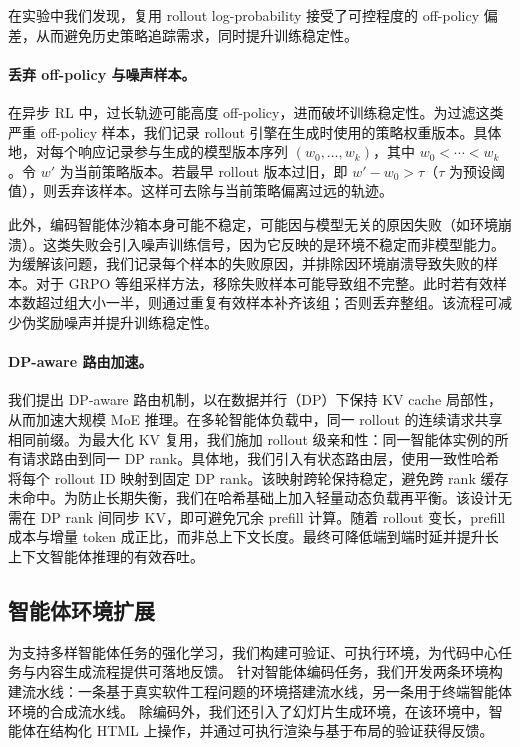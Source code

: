 在实验中我们发现，复用 rollout log-probability 接受了可控程度的 off-policy 偏差，从而避免历史策略追踪需求，同时提升训练稳定性。


\paragraph{丢弃 off-policy 与噪声样本。}
在异步 RL 中，过长轨迹可能高度 off-policy，进而破坏训练稳定性。为过滤这类严重 off-policy 样本，我们记录 rollout 引擎在生成时使用的策略权重版本。具体地，对每个响应记录参与生成的模型版本序列 $(w_0, \ldots, w_k)$，其中 $w_0 < \cdots < w_k$。令 $w'$ 为当前策略版本。若最早 rollout 版本过旧，即 $w' - w_0 > \tau$（$\tau$ 为预设阈值），则丢弃该样本。这样可去除与当前策略偏离过远的轨迹。

此外，编码智能体沙箱本身可能不稳定，可能因与模型无关的原因失败（如环境崩溃）。这类失败会引入噪声训练信号，因为它反映的是环境不稳定而非模型能力。为缓解该问题，我们记录每个样本的失败原因，并排除因环境崩溃导致失败的样本。对于 GRPO 等组采样方法，移除失败样本可能导致组不完整。此时若有效样本数超过组大小一半，则通过重复有效样本补齐该组；否则丢弃整组。该流程可减少伪奖励噪声并提升训练稳定性。


\paragraph{DP-aware 路由加速。}
我们提出 DP-aware 路由机制，以在数据并行（DP）下保持 KV cache 局部性，从而加速大规模 MoE 推理。在多轮智能体负载中，同一 rollout 的连续请求共享相同前缀。为最大化 KV 复用，我们施加 rollout 级亲和性：同一智能体实例的所有请求路由到同一 DP rank。具体地，我们引入有状态路由层，使用一致性哈希将每个 rollout ID 映射到固定 DP rank。该映射跨轮保持稳定，避免跨 rank 缓存未命中。为防止长期失衡，我们在哈希基础上加入轻量动态负载再平衡。该设计无需在 DP rank 间同步 KV，即可避免冗余 prefill 计算。随着 rollout 变长，prefill 成本与增量 token 成正比，而非总上下文长度。最终可降低端到端时延并提升长上下文智能体推理的有效吞吐。



\subsection{智能体环境扩展}

为支持多样智能体任务的强化学习，我们构建可验证、可执行环境，为代码中心任务与内容生成流程提供可落地反馈。
针对智能体编码任务，我们开发两条环境构建流水线：一条基于真实软件工程问题的环境搭建流水线，另一条用于终端智能体环境的合成流水线。
除编码外，我们还引入了幻灯片生成环境，在该环境中，智能体在结构化 HTML 上操作，并通过可执行渲染与基于布局的验证获得反馈。

